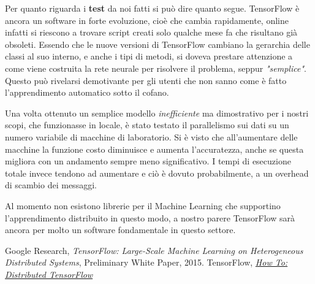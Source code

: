 \documentclass[DIV=calc, paper=a4, fontsize=11pt]{scrartcl}	 %
\begin{document}
\begin{multicols}{2}
			Per quanto riguarda i \textbf{test} da noi fatti si può dire quanto segue. TensorFlow è ancora un software in forte evoluzione, cioè che cambia rapidamente, online infatti si riescono a trovare script creati solo qualche mese fa che risultano già obsoleti. Essendo che le nuove versioni di TensorFlow cambiano la gerarchia delle classi al suo interno, e anche i tipi di metodi, si doveva prestare attenzione a come viene costruita la rete neurale per risolvere il problema, seppur \textit{"semplice"}. Questo può rivelarsi demotivante per gli utenti che non sanno come è fatto l'apprendimento automatico sotto il cofano.
			
			Una volta ottenuto un semplice modello \textit{inefficiente} ma dimostrativo per i nostri scopi, che funzionasse in locale, è stato testato il parallelismo sui dati su un numero variabile di macchine di laboratorio. Si è visto che all'aumentare delle macchine la funzione costo diminuisce e aumenta l'accuratezza, anche se questa migliora con un andamento sempre meno significativo. I tempi di esecuzione totale invece tendono ad aumentare e ciò è dovuto probabilmente, a un overhead di scambio dei messaggi.
			
			Al momento non esistono librerie per il Machine Learning che supportino l'apprendimento distribuito in questo modo, a nostro parere TensorFlow sarà ancora per molto un software fondamentale in questo settore.
			
		\begin{thebibliography}{9}
			Google Research,
			\emph{TensorFlow: Large-Scale Machine Learning on Heterogeneous Distributed Systems},
			Preliminary White Paper,
			2015.
			TensorFlow,
			\emph{\href{https://www.tensorflow.org/versions/r0.10/how_tos/distributed/}{How To: Distributed TensorFlow}}
		\end{thebibliography}
	\end{multicols}
\end{document}
